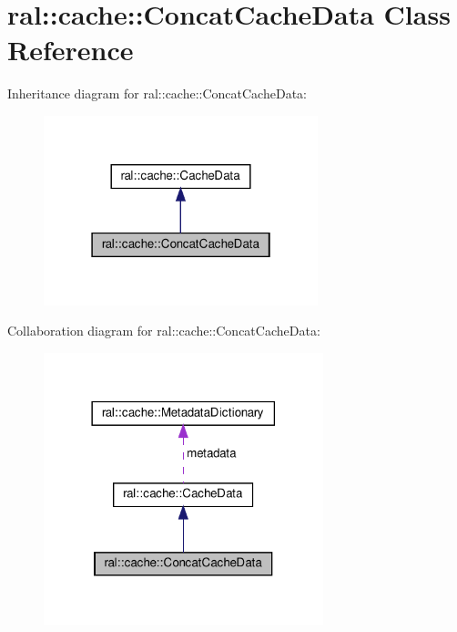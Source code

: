 \hypertarget{classral_1_1cache_1_1ConcatCacheData}{}\section{ral\+:\+:cache\+:\+:Concat\+Cache\+Data Class Reference}
\label{classral_1_1cache_1_1ConcatCacheData}


Inheritance diagram for ral\+:\+:cache\+:\+:Concat\+Cache\+Data\+:\nopagebreak
\begin{figure}[H]
\begin{center}
\leavevmode
\includegraphics[width=226pt]{classral_1_1cache_1_1ConcatCacheData__inherit__graph}
\end{center}
\end{figure}


Collaboration diagram for ral\+:\+:cache\+:\+:Concat\+Cache\+Data\+:\nopagebreak
\begin{figure}[H]
\begin{center}
\leavevmode
\includegraphics[width=230pt]{classral_1_1cache_1_1ConcatCacheData__coll__graph}
\end{center}
\end{figure}
